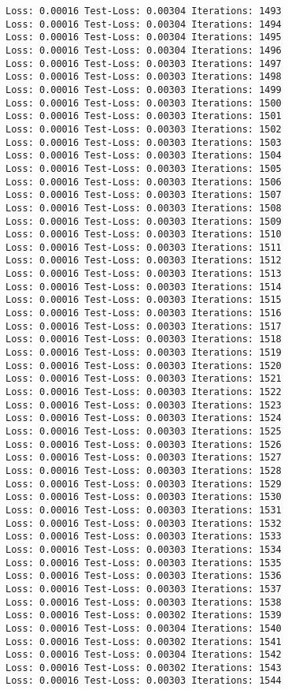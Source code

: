 \documentclass[11pt]{article}
\begin{document}
\begin{Verbatim}[commandchars=\\\{\}]
Loss: 0.00016 Test-Loss: 0.00304 Iterations: 1493
Loss: 0.00016 Test-Loss: 0.00304 Iterations: 1494
Loss: 0.00016 Test-Loss: 0.00304 Iterations: 1495
Loss: 0.00016 Test-Loss: 0.00304 Iterations: 1496
Loss: 0.00016 Test-Loss: 0.00303 Iterations: 1497
Loss: 0.00016 Test-Loss: 0.00303 Iterations: 1498
Loss: 0.00016 Test-Loss: 0.00303 Iterations: 1499
Loss: 0.00016 Test-Loss: 0.00303 Iterations: 1500
Loss: 0.00016 Test-Loss: 0.00303 Iterations: 1501
Loss: 0.00016 Test-Loss: 0.00303 Iterations: 1502
Loss: 0.00016 Test-Loss: 0.00303 Iterations: 1503
Loss: 0.00016 Test-Loss: 0.00303 Iterations: 1504
Loss: 0.00016 Test-Loss: 0.00303 Iterations: 1505
Loss: 0.00016 Test-Loss: 0.00303 Iterations: 1506
Loss: 0.00016 Test-Loss: 0.00303 Iterations: 1507
Loss: 0.00016 Test-Loss: 0.00303 Iterations: 1508
Loss: 0.00016 Test-Loss: 0.00303 Iterations: 1509
Loss: 0.00016 Test-Loss: 0.00303 Iterations: 1510
Loss: 0.00016 Test-Loss: 0.00303 Iterations: 1511
Loss: 0.00016 Test-Loss: 0.00303 Iterations: 1512
Loss: 0.00016 Test-Loss: 0.00303 Iterations: 1513
Loss: 0.00016 Test-Loss: 0.00303 Iterations: 1514
Loss: 0.00016 Test-Loss: 0.00303 Iterations: 1515
Loss: 0.00016 Test-Loss: 0.00303 Iterations: 1516
Loss: 0.00016 Test-Loss: 0.00303 Iterations: 1517
Loss: 0.00016 Test-Loss: 0.00303 Iterations: 1518
Loss: 0.00016 Test-Loss: 0.00303 Iterations: 1519
Loss: 0.00016 Test-Loss: 0.00303 Iterations: 1520
Loss: 0.00016 Test-Loss: 0.00303 Iterations: 1521
Loss: 0.00016 Test-Loss: 0.00303 Iterations: 1522
Loss: 0.00016 Test-Loss: 0.00303 Iterations: 1523
Loss: 0.00016 Test-Loss: 0.00303 Iterations: 1524
Loss: 0.00016 Test-Loss: 0.00303 Iterations: 1525
Loss: 0.00016 Test-Loss: 0.00303 Iterations: 1526
Loss: 0.00016 Test-Loss: 0.00303 Iterations: 1527
Loss: 0.00016 Test-Loss: 0.00303 Iterations: 1528
Loss: 0.00016 Test-Loss: 0.00303 Iterations: 1529
Loss: 0.00016 Test-Loss: 0.00303 Iterations: 1530
Loss: 0.00016 Test-Loss: 0.00303 Iterations: 1531
Loss: 0.00016 Test-Loss: 0.00303 Iterations: 1532
Loss: 0.00016 Test-Loss: 0.00303 Iterations: 1533
Loss: 0.00016 Test-Loss: 0.00303 Iterations: 1534
Loss: 0.00016 Test-Loss: 0.00303 Iterations: 1535
Loss: 0.00016 Test-Loss: 0.00303 Iterations: 1536
Loss: 0.00016 Test-Loss: 0.00303 Iterations: 1537
Loss: 0.00016 Test-Loss: 0.00303 Iterations: 1538
Loss: 0.00016 Test-Loss: 0.00302 Iterations: 1539
Loss: 0.00016 Test-Loss: 0.00304 Iterations: 1540
Loss: 0.00016 Test-Loss: 0.00302 Iterations: 1541
Loss: 0.00016 Test-Loss: 0.00304 Iterations: 1542
Loss: 0.00016 Test-Loss: 0.00302 Iterations: 1543
Loss: 0.00016 Test-Loss: 0.00303 Iterations: 1544

\end{Verbatim}
\end{document}
